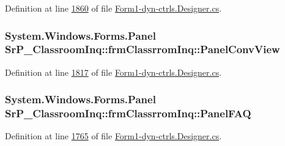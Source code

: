 \-Definition at line \hyperlink{_form1-dyn-ctrls_8_designer_8cs_source_l01860}{1860} of file \hyperlink{_form1-dyn-ctrls_8_designer_8cs_source}{\-Form1-\/dyn-\/ctrls.\-Designer.\-cs}.

\hypertarget{class_sr_p___classroom_inq_1_1frm_classrrom_inq_ae5d62ffd766ae877bf37d56567d836d5}{
\subsubsection[{\-Panel\-Conv\-View}]{\setlength{\rightskip}{0pt plus 5cm}\-System.\-Windows.\-Forms.\-Panel {\bf \-Sr\-P\-\_\-\-Classroom\-Inq\-::frm\-Classrrom\-Inq\-::\-Panel\-Conv\-View}}}
\label{class_sr_p___classroom_inq_1_1frm_classrrom_inq_ae5d62ffd766ae877bf37d56567d836d5}


\-Definition at line \hyperlink{_form1-dyn-ctrls_8_designer_8cs_source_l01817}{1817} of file \hyperlink{_form1-dyn-ctrls_8_designer_8cs_source}{\-Form1-\/dyn-\/ctrls.\-Designer.\-cs}.

\hypertarget{class_sr_p___classroom_inq_1_1frm_classrrom_inq_ae18ea5d89fce8227797626585e3e2a1a}{
\subsubsection[{\-Panel\-F\-A\-Q}]{\setlength{\rightskip}{0pt plus 5cm}\-System.\-Windows.\-Forms.\-Panel {\bf \-Sr\-P\-\_\-\-Classroom\-Inq\-::frm\-Classrrom\-Inq\-::\-Panel\-F\-A\-Q}}}
\label{class_sr_p___classroom_inq_1_1frm_classrrom_inq_ae18ea5d89fce8227797626585e3e2a1a}


\-Definition at line \hyperlink{_form1-dyn-ctrls_8_designer_8cs_source_l01765}{1765} of file \hyperlink{_form1-dyn-ctrls_8_designer_8cs_source}{\-Form1-\/dyn-\/ctrls.\-Designer.\-cs}.

